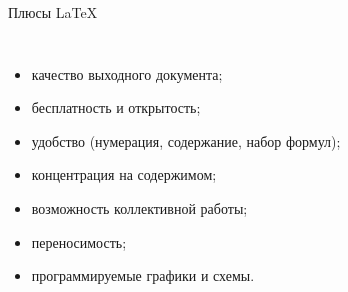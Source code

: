 \begin{frame}{Плюсы \LaTeX}
\begin{columns}
        \begin{itemize}
            \pause\item качество выходного документа;
            \pause\item бесплатность и открытость;
            \pause\item удобство (нумерация, содержание, набор формул);
            \pause\item концентрация на содержимом;
            \pause\item возможность коллективной работы;
            \pause\item переносимость;
            \pause\item программируемые графики и схемы.
        \end{itemize}
    \end{columns}
\end{frame}

